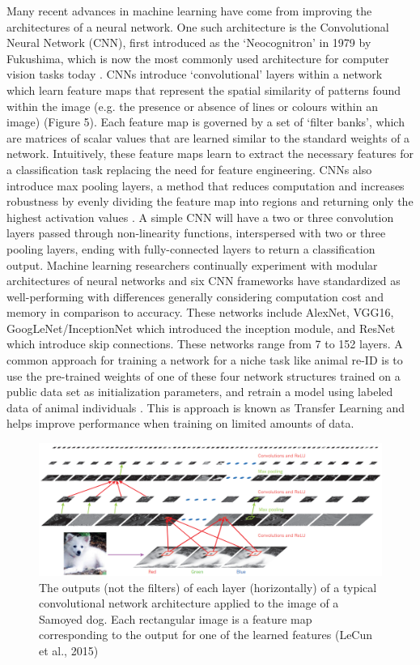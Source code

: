 \documentclass[11pt]{article}
\begin{document}
Many recent advances in machine learning have come from improving the architectures of a neural network. One such architecture is the Convolutional Neural Network (CNN), first introduced as the `Neocognitron' in 1979 by Fukushima, which is now the most commonly used architecture for computer vision tasks today \cite{fukushima1979neural, krizhevsky2012imagenet}. CNNs introduce `convolutional' layers within a network which learn feature maps that represent the spatial similarity of patterns found within the image (e.g. the presence or absence of lines or colours within an image) \cite{lecun2015deep} (Figure 5). Each feature map is governed by a set of `filter banks', which are matrices of scalar values that are learned similar to the standard weights of a network. Intuitively, these feature maps learn to extract the necessary features for a classification task replacing the need for feature engineering. CNNs also introduce max pooling layers, a method that reduces computation and increases robustness by evenly dividing the feature map into regions and returning only the highest activation values \cite{lecun2015deep}. A simple CNN will have a two or three convolution layers passed through non-linearity functions, interspersed with two or three pooling layers, ending with fully-connected layers to return a classification output. Machine learning researchers continually experiment with modular architectures of neural networks and six CNN frameworks have standardized as well-performing with differences generally considering computation cost and memory in comparison to accuracy. These networks include AlexNet, VGG16, GoogLeNet/InceptionNet which introduced the inception module, and ResNet which introduce skip connections\cite{krizhevsky2012imagenet, simonyan2014very, szegedy2015going, he2016deep}. These networks range from 7 to 152 layers. A common approach for training a network for a niche task like animal re-ID is to use the pre-trained weights of one of these four network structures trained on a public data set as initialization parameters, and retrain a model using labeled data of animal individuals \cite{pan2010survey}. This is approach is known as Transfer Learning and helps improve performance when training on limited amounts of data\cite{pan2010survey}.
\newline

\begin{figure}
\includegraphics[width=1\textwidth]{BasicConvNet.png}
\caption{The outputs (not the filters) of each layer (horizontally) of a typical convolutional network architecture applied to the image of a Samoyed dog. Each rectangular image is a feature map corresponding to the output for one of the learned features (LeCun et al., 2015)}
\end{figure}
\end{document}
